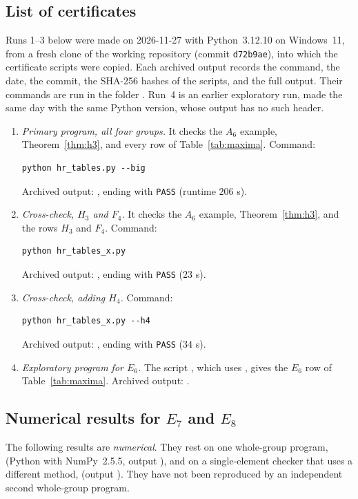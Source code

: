 \documentclass[11pt]{amsart}
\theoremstyle{definition}\newtheorem{definition}[theorem]{Definition}
\theoremstyle{remark}\newtheorem{remark}[theorem]{Remark}
\begin{document}
\subsection{List of certificates}
Runs 1--3 below were made on 2026-11-27 with Python~3.12.10 on Windows~11, from a fresh clone of the working repository (commit \texttt{d72b9ae}), into which the certificate scripts were copied. Each archived output records the command, the date, the commit, the SHA-256 hashes of the scripts, and the full output. Their commands are run in the folder . Run~4 is an earlier exploratory run, made the same day with the same Python version, whose output has no such header.
\begin{enumerate}
\item \emph{Primary program, all four groups.} It checks the \(A_6\) example, Theorem~\ref{thm:h3}, and every row of Table~\ref{tab:maxima}. Command:
\begin{verbatim}
python hr_tables.py --big
\end{verbatim}
Archived output: , ending with \texttt{PASS} (runtime \(206\) s).
\item \emph{Cross-check, \(H_3\) and \(F_4\).} It checks the \(A_6\) example, Theorem~\ref{thm:h3}, and the rows \(H_3\) and \(F_4\). Command:
\begin{verbatim}
python hr_tables_x.py
\end{verbatim}
Archived output: , ending with \texttt{PASS} (\(23\) s).
\item \emph{Cross-check, adding \(H_4\).} Command:
\begin{verbatim}
python hr_tables_x.py --h4
\end{verbatim}
Archived output: , ending with \texttt{PASS} (\(34\) s).
\item \emph{Exploratory program for \(E_6\).} The script , which uses , gives the \(E_6\) row of Table~\ref{tab:maxima}. Archived output: .
\end{enumerate}

\subsection{Numerical results for \texorpdfstring{\(E_7\)}{E7} and \texorpdfstring{\(E_8\)}{E8}}\label{sec:numerical}
The following results are \emph{numerical}. They rest on one whole-group program,  (Python with NumPy~2.5.5, output ), and on a single-element checker that uses a different method,  (output ). They have not been reproduced by an independent second whole-group program.
\end{document}
